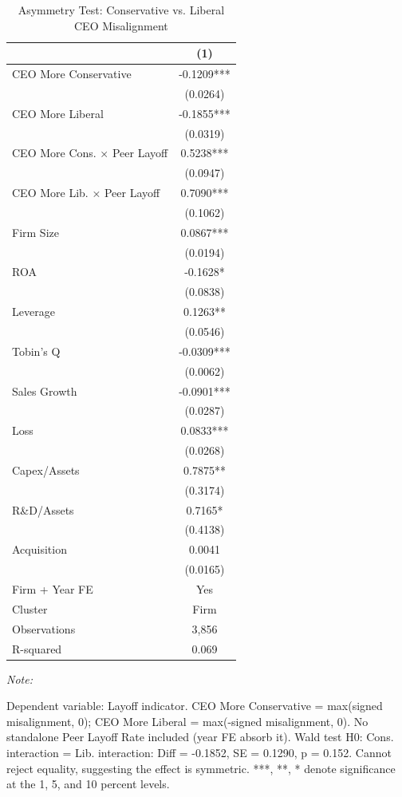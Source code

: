 \documentclass[
  10pt,
]{article}
\begin{document}
\begin{table}[!h]
\centering
\caption{\label{tab:table7}Asymmetry Test: Conservative vs. Liberal CEO Misalignment}
\centering
\fontsize{9}{11}\selectfont
\begin{threeparttable}
\begin{tabular}[t]{lc}
\toprule
 & (1)\\
\midrule
CEO More Conservative & -0.1209***\\
 & (0.0264)\\
CEO More Liberal & -0.1855***\\
 & (0.0319)\\
CEO More Cons. × Peer Layoff & 0.5238***\\
\addlinespace
 & (0.0947)\\
CEO More Lib. × Peer Layoff & 0.7090***\\
 & (0.1062)\\
Firm Size & 0.0867***\\
 & (0.0194)\\
\addlinespace
ROA & -0.1628*\\
 & (0.0838)\\
Leverage & 0.1263**\\
 & (0.0546)\\
Tobin's Q & -0.0309***\\
\addlinespace
 & (0.0062)\\
Sales Growth & -0.0901***\\
 & (0.0287)\\
Loss & 0.0833***\\
 & (0.0268)\\
\addlinespace
Capex/Assets & 0.7875**\\
 & (0.3174)\\
R\&D/Assets & 0.7165*\\
 & (0.4138)\\
Acquisition & 0.0041\\
\addlinespace
 & (0.0165)\\
\midrule
Firm + Year FE & Yes\\
Cluster & Firm\\
Observations & 3,856\\
R-squared & 0.069\\
\bottomrule
\end{tabular}
\begin{tablenotes}[para]
\item \textit{Note: } 
\item Dependent variable: Layoff indicator. CEO More Conservative = max(signed misalignment, 0); CEO More Liberal = max(-signed misalignment, 0). No standalone Peer Layoff Rate included (year FE absorb it). Wald test H0: Cons. interaction = Lib. interaction: Diff = -0.1852, SE = 0.1290, p = 0.152. Cannot reject equality, suggesting the effect is symmetric. ***, **, * denote significance at the 1, 5, and 10 percent levels.
\end{tablenotes}
\end{threeparttable}
\end{table}
\end{document}
